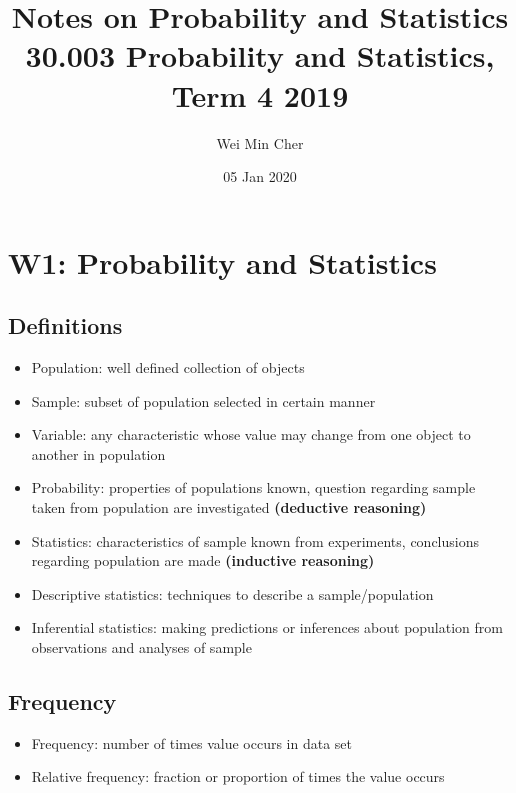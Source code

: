 \documentclass[a4paper]{article}
\begin{document}
\title{Notes on Probability and Statistics\\[0.1cm]
    \large 30.003 Probability and Statistics, Term 4 2019}
\author{Wei Min Cher}
\date{05 Jan 2020}

\maketitle

\tableofcontents

\newpage
\section{W1: Probability and Statistics}
\subsection{Definitions}
\begin{itemize}
    \item Population: well defined collection of objects
    \item Sample: subset of population selected in certain manner
    \item Variable: any characteristic whose value may change from one object to another in population
    \newline
    \item Probability: properties of populations known, question regarding sample taken from population are investigated \textbf{(deductive reasoning)}
    \item Statistics: characteristics of sample known from experiments, conclusions regarding population are made \textbf{(inductive reasoning)}
\end{itemize}
\begin{center}
\end{center}
\begin{itemize}
    \item Descriptive statistics: techniques to describe a sample/population
    \item Inferential statistics: making predictions or inferences about population from observations and analyses of sample
\end{itemize}
\subsection{Frequency} 
\begin{itemize}
    \item Frequency: number of times value occurs in data set
    \item Relative frequency: fraction or proportion of times the value occurs
\end{itemize}
\end{document}
